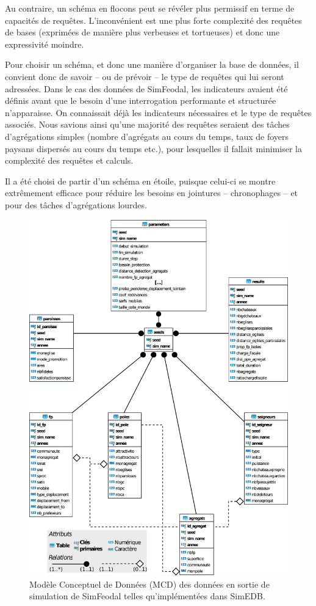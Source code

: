 Au contraire, un schéma \og en flocons\fg{} \autocite{noauthor_snowflake_2018} peut se révéler plus permissif en terme de capacités de requêtes.
L'inconvénient est une plus forte complexité des requêtes de bases (exprimées de manière plus verbeuses et tortueuses) et donc une expressivité moindre.

Pour choisir un schéma, et donc une manière d'organiser la base de données, il convient donc de savoir -- ou de prévoir -- le type de requêtes qui lui seront adressées.
Dans le cas des données de SimFeodal, les indicateurs avaient été définis avant que le besoin d'une interrogation performante et structurée n'apparaisse.
On connaissait déjà les indicateurs nécessaires et le type de requêtes associés.
Nous savions ainsi qu'une majorité des requêtes seraient des tâches d'agrégations simples (nombre d'agrégats au cours du temps, taux de foyers paysans dispersés au cours du temps etc.), pour lesquelles il fallait minimiser la complexité des requêtes et calculs.

Il a été choisi de partir d'un schéma en étoile, puisque celui-ci se montre extrêmement efficace pour réduire les besoins en jointures -- chronophages -- et pour des tâches d'agrégations lourdes.

\clearpage
\begin{figure}[H]
	\centering
	\captionsetup{width=\linewidth}
	\includegraphics[width=\linewidth]{img/MCD_SimEDB_repris.png}
	\caption{Modèle Conceptuel de Données (MCD) des données en sortie de simulation de SimFeodal telles qu'implémentées dans SimEDB.}
	\label{fig:MCD_SimEDB}
\end{figure}

